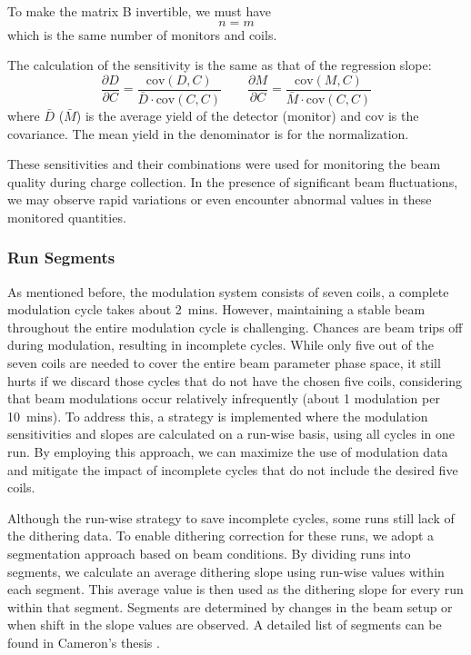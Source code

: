 To make the matrix B invertible, we must have
\begin{equation}
    n = m
\end{equation}
which is the same number of monitors and coils.

The calculation of the sensitivity is the same as that of the regression slope:
\begin{equation}
    \frac{\partial D}{\partial C} = \frac{\text{cov}(D, C)}{\bar{D} \cdot \text{cov}(C, C)}
    \qquad
    \frac{\partial M}{\partial C} = \frac{\text{cov}(M, C)}{\bar{M} \cdot \text{cov}(C, C)}
\end{equation}
where $\bar{D}$ ($\bar{M}$) is the average yield of the detector (monitor) and 
$\text{cov}$ is the covariance. The
mean yield in the denominator is for the normalization. 

These sensitivities and their combinations were used for monitoring the beam quality 
during charge collection. In the presence of significant beam fluctuations, we may observe rapid variations or even encounter abnormal values in these monitored quantities.

\subsubsection{Run Segments}
As mentioned before, the modulation system consists of seven coils, a complete 
modulation cycle takes about 2~mins. However, maintaining a stable beam throughout
the entire modulation cycle is challenging. Chances are beam trips off during modulation, 
resulting in incomplete cycles. While only five out of the seven coils are needed 
to cover the entire beam parameter phase space, 
it still hurts if we discard those cycles that do not have the chosen five coils,
considering that beam modulations occur relatively infrequently (about 1 modulation per 10~mins).
To address this, a strategy is implemented where the modulation sensitivities and 
slopes are calculated on a run-wise basis, using all cycles in one run. By employing this approach, we can maximize the use of modulation data and mitigate the impact of incomplete cycles that do not include the desired five coils.

Although the run-wise strategy to save incomplete cycles, some runs still
lack of the dithering data. To enable dithering correction for these runs, 
we adopt a segmentation approach based on beam conditions. 
By dividing runs into segments, we calculate an average dithering slope
using run-wise values within each segment. This average value is then
used as the dithering slope for every run within that segment. Segments are
determined by changes in the beam setup or when shift in the slope values are observed. 
A detailed list of segments can be found in Cameron's thesis \cite{Cameron2021}.

